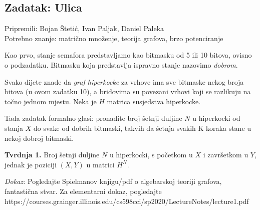 \subsection*{Zadatak: Ulica}
\textsf{Pripremili: Bojan Štetić, Ivan Paljak, Daniel Paleka}\\
\textsf{Potrebno znanje: matrično množenje, teorija grafova, brzo potenciranje}

Kao prvo, stanje semafora predstavljamo kao bitmasku od 5 ili 10 bitova, ovisno
o podzadatku. Bitmasku koja predstavlja ispravno stanje nazovimo
\emph{dobrom}.

Svako dijete znade da \emph{graf hiperkocke} za vrhove ima sve bitmaske nekog
broja bitova (u ovom zadatku 10), a bridovima su povezani vrhovi koji se
razlikuju na točno jednom mjestu. Neka je $H$ matrica susjedstva hiperkocke.

Tada zadatak formalno glasi: pronađite broj šetnji duljine $N$ u hiperkocki 
od stanja $X$ do svake od dobrih bitmaski, takvih da šetnja svakih K koraka
stane u nekoj dobroj bitmaski.

\textbf{Tvrdnja 1.} Broj šetnji duljine $N$ u hiperkocki, s početkom u $X$ 
i završetkom u $Y$, jednak je poziciji $(X, Y)$ u matrici $H^N$.

\textit{Dokaz:} Pogledajte Spielmanov knjigu/pdf o algebarskoj teoriji grafova,
fantastična stvar. Za elementarni dokaz, pogledajte
\\
{https://courses.grainger.illinois.edu/cs598cci/sp2020/LectureNotes/lecture1.pdf}




